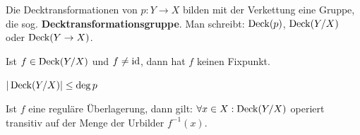 \begin{bemerkung}%
    \begin{bemenum}
        \item Die Decktransformationen von $p: Y \rightarrow X$ bilden mit der Verkettung eine Gruppe, 
              die sog. \textbf{Decktransformationsgruppe}.
              Man schreibt:
              $\operatorname{Deck}(p)$, $\operatorname{Deck}(Y/X)$ oder $\operatorname{Deck}(Y \rightarrow X)$.
        \item Ist $f \in \operatorname{Deck}(Y/X)$ und $f \neq \textnormal{id}$, dann hat
              $f$ keinen Fixpunkt.
        \item $|\operatorname{Deck}(Y/X)| \leq \deg{p}$\label{kor:12.14c}
        \item Ist $f$ eine reguläre Überlagerung, dann gilt:
              $\forall x \in X: \operatorname{Deck}(Y/X)$ operiert transitiv
              auf der Menge der Urbilder $f^{-1}(x)$.
    \end{bemenum}
\end{bemerkung}

